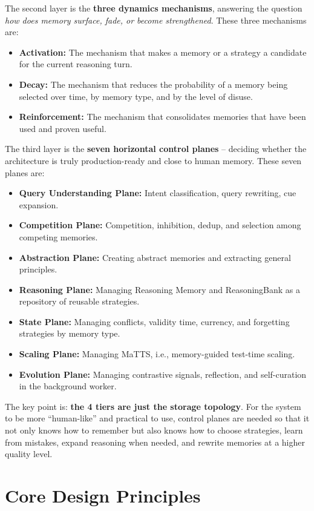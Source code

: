 \documentclass[a4paper,12pt]{article}
\begin{document}
The second layer is the \textbf{three dynamics mechanisms}, answering the question \emph{how does memory surface, fade, or become strengthened}. These three mechanisms are:
\begin{itemize}
    \item \textbf{Activation:} The mechanism that makes a memory or a strategy a candidate for the current reasoning turn.
    \item \textbf{Decay:} The mechanism that reduces the probability of a memory being selected over time, by memory type, and by the level of disuse.
    \item \textbf{Reinforcement:} The mechanism that consolidates memories that have been used and proven useful.
\end{itemize}

The third layer is the \textbf{seven horizontal control planes} -- deciding whether the architecture is truly production-ready and close to human memory. These seven planes are:
\begin{itemize}
    \item \textbf{Query Understanding Plane:} Intent classification, query rewriting, cue expansion.
    \item \textbf{Competition Plane:} Competition, inhibition, dedup, and selection among competing memories.
    \item \textbf{Abstraction Plane:} Creating abstract memories and extracting general principles.
    \item \textbf{Reasoning Plane:} Managing Reasoning Memory and ReasoningBank as a repository of reusable strategies.
    \item \textbf{State Plane:} Managing conflicts, validity time, currency, and forgetting strategies by memory type.
    \item \textbf{Scaling Plane:} Managing MaTTS, i.e., memory-guided test-time scaling.
    \item \textbf{Evolution Plane:} Managing contrastive signals, reflection, and self-curation in the background worker.
\end{itemize}

The key point is: \textbf{the 4 tiers are just the storage topology}. For the system to be more ``human-like'' and practical to use, control planes are needed so that it not only knows how to remember but also knows how to choose strategies, learn from mistakes, expand reasoning when needed, and rewrite memories at a higher quality level.

\section{Core Design Principles}
\end{document}
